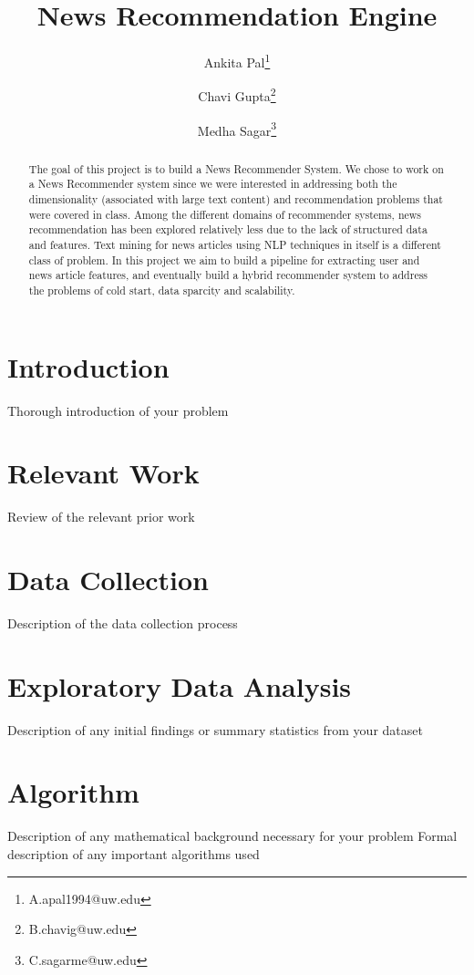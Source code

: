 \documentclass{article}
\title{News Recommendation Engine}
\author[1]{Ankita Pal\thanks{A.apal1994@uw.edu}}
\author[1]{Chavi Gupta\thanks{B.chavig@uw.edu}}
\author[1]{Medha Sagar\thanks{C.sagarme@uw.edu}}
\affil[1]{Department of Data Science, University of Washington}
\begin{document}
\maketitle

\begin{abstract}
    The goal of this project is to build a News Recommender System. We chose to work on a News Recommender system since we were interested in addressing both the dimensionality (associated with large text content) and recommendation problems that were covered in class. Among the different domains of recommender systems, news recommendation has been explored relatively less due to the lack of structured data and features. Text mining for news articles using NLP techniques in itself is a different class of problem. In this project we aim to build a pipeline for extracting user and news article features, and eventually build a hybrid recommender system to address the problems of cold start, data sparcity and scalability. 
\end{abstract}

\section{Introduction}

{Thorough introduction of your problem}

\section{Relevant Work}

{Review of the relevant prior work}

\section{Data Collection}

{Description of the data collection process}

\section{Exploratory Data Analysis}

{Description of any initial findings or summary statistics from your dataset}

\section{Algorithm}

{Description of any mathematical background necessary for your problem
Formal description of any important algorithms used
}
\end{document}
